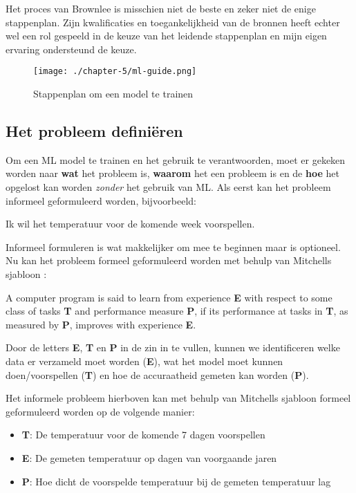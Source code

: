 Het proces van Brownlee is misschien niet de beste en zeker niet de enige stappenplan. Zijn kwalificaties en toegankelijkheid van de bronnen heeft echter wel een rol gespeeld in de keuze van het leidende stappenplan en mijn eigen ervaring ondersteund de keuze.

\begin{figure}[hbt!]
  \centering
  \texttt{[image: ./chapter-5/ml-guide.png]}
  \caption{Stappenplan om een model te trainen}
  \label{fig:ml-guide}
\end{figure}

\subsection{Het probleem definiëren}\label{subsec:het-probleem-definieren}
Om een ML model te trainen en het gebruik te verantwoorden, moet er gekeken worden naar \textbf{wat} het probleem is, \textbf{waarom} het een probleem is en de \textbf{hoe} het opgelost kan worden \textit{zonder} het gebruik van ML. Als eerst kan het probleem informeel geformuleerd worden, bijvoorbeeld:

\begin{quoting}
  \centering
  Ik wil het temperatuur voor de komende week voorspellen.
\end{quoting}

Informeel formuleren is wat makkelijker om mee te beginnen maar is optioneel. Nu kan het probleem formeel geformuleerd worden met behulp van Mitchells sjabloon \cite{machine-learning-mitchell}:

\begin{quoting}
  A computer program is said to learn from experience \textbf{E} with respect to some class of tasks \textbf{T} and performance measure \textbf{P}, if its performance at tasks in \textbf{T}, as measured by \textbf{P}, improves with experience \textbf{E}. 
\end{quoting}

Door de letters \textbf{E}, \textbf{T} en \textbf{P} in de zin in te vullen, kunnen we identificeren welke data er verzameld moet worden (\textbf{E}), wat het model moet kunnen doen/voorspellen (\textbf{T}) en hoe de accuraatheid gemeten kan worden (\textbf{P}).

Het informele probleem hierboven kan met behulp van Mitchells sjabloon formeel geformuleerd worden op de volgende manier:

\begin{itemize}
  \item \textbf{T}: De temperatuur voor de komende 7 dagen voorspellen
  \item \textbf{E}: De gemeten temperatuur op dagen van voorgaande jaren
  \item \textbf{P}: Hoe dicht de voorspelde temperatuur bij de gemeten temperatuur lag
\end{itemize}

